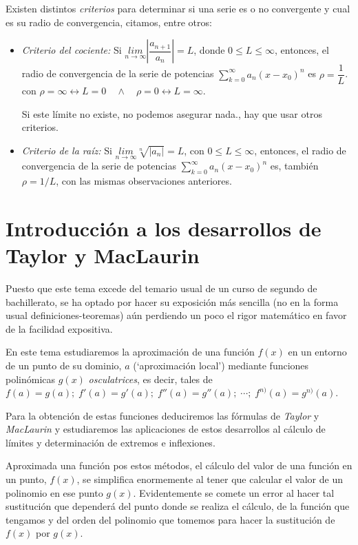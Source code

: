 Existen distintos \emph{criterios} para determinar si una serie es o no convergente y cual es su radio de convergencia, citamos, entre otros:
\begin{itemize}
	\item \emph{Criterio del cociente: } Si $\underset {n\to \infty}{lim}{\left| \dfrac {a_{n+1}}{a_n} \right|}=L$, donde $0\le L \le \infty$, entonces, el radio de convergencia de la serie de potencias $\sum _{ k=0 }^{ \infty }{a_n(x-x_0)^n}$ es $\rho=\dfrac 1 L$. con $\rho=\infty \leftrightarrow L=0 \quad \wedge \quad \rho=0 \leftrightarrow L=\infty$.
	
	Si este límite no existe, no podemos asegurar nada., hay que usar otros criterios.
	\item \emph{Criterio de la raíz: } Si $\underset{n\to \infty}{lim}{\sqrt[n]{|a_n|}}=L$,  con  $ 0\le L \le \infty$, entonces, el radio de convergencia de la serie de potencias $\sum _{ k=0 }^{ \infty }{a_n(x-x_0)^n}$ es, también  $\rho=1/L$, con las mismas observaciones anteriores.
\end{itemize} 

\section{Introducción a los desarrollos de Taylor y MacLaurin}

Puesto que este tema excede del temario usual de un curso de segundo de bachillerato, se ha optado por hacer su exposición más sencilla (no en la forma usual definiciones-teoremas) aún perdiendo un poco el rigor matemático en favor de la facilidad expositiva.

En este tema estudiaremos la aproximación de una función $f(x)$ en un entorno de un punto de su dominio, $a$ (`aproximación local') mediante funciones polinómicas $g(x)$ \emph{osculatrices}, es decir, tales de $f(a)=g(a); \; f'(a)=g'(a); \; f''(a)=g''(a); \; \cdots  ; \; f^{n)}(a)=g^{n)}(a)$.

Para la obtención de estas funciones deduciremos las fórmulas de \emph{Taylor} y \emph{MacLaurin} y estudiaremos las aplicaciones de estos desarrollos al cálculo de límites y determinación de extremos e inflexiones.

Aproximada una función pos estos métodos, el cálculo del valor de una función en un punto, $f(x)$, se simplifica enormemente al tener que calcular el valor de un polinomio en ese punto $g(x)$. Evidentemente se comete un error al hacer tal sustitución que dependerá del punto donde se realiza el cálculo, de la función que tengamos y del orden del polinomio que tomemos para hacer la sustitución de $f(x)$ por $g(x)$.


